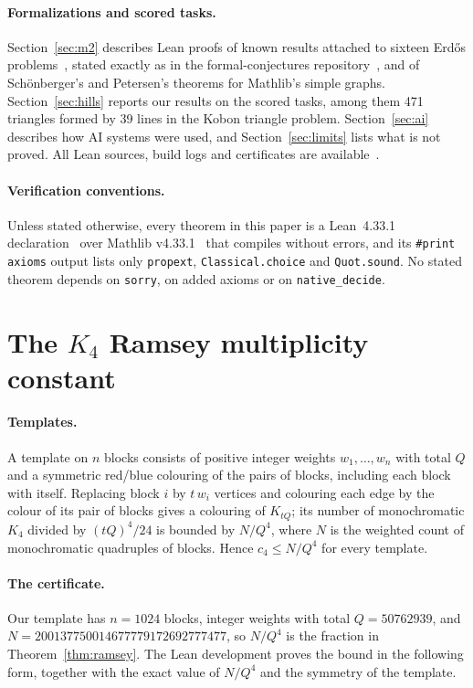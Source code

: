 \documentclass[11pt,a4paper]{article}
\newcommand{\lean}[1]{\texttt{#1}}
\theoremstyle{remark}
\begin{document}
\paragraph{Formalizations and scored tasks.}
Section~\ref{sec:m2} describes Lean proofs of known results attached to sixteen Erd\H{o}s problems~\cite{erdosproblems},
stated exactly as in the formal-conjectures repository~\cite{fc}, and of Sch\"onberger's and Petersen's theorems for
Mathlib's simple graphs. Section~\ref{sec:hills} reports our results on the scored tasks, among them 471 triangles
formed by 39 lines in the Kobon triangle problem. Section~\ref{sec:ai} describes how AI systems were used, and
Section~\ref{sec:limits} lists what is not proved. All Lean sources, build logs and certificates are available~\cite{repo}.

\paragraph{Verification conventions.}
Unless stated otherwise, every theorem in this paper is a Lean~4.33.1 declaration~\cite{lean4} over Mathlib
v4.33.1~\cite{mathlib} that compiles without errors, and its \lean{\#print axioms} output lists only \lean{propext},
\lean{Classical.choice} and \lean{Quot.sound}. No stated theorem depends on \lean{sorry}, on added axioms or on
\lean{native\_decide}.

\section{The $K_4$ Ramsey multiplicity constant}\label{sec:ramsey}

\paragraph{Templates.}
A template on $n$ blocks consists of positive integer weights $w_1,\dots,w_n$ with total $Q$ and a symmetric
red/blue colouring of the pairs of blocks, including each block with itself. Replacing block $i$ by $t\,w_i$ vertices
and colouring each edge by the colour of its pair of blocks gives a colouring of $K_{tQ}$; its number of
monochromatic $K_4$ divided by $(tQ)^4/24$ is bounded by $N/Q^4$, where $N$ is the weighted count of monochromatic
quadruples of blocks. Hence $c_4\le N/Q^4$ for every template.

\paragraph{The certificate.}
Our template has $n=1024$ blocks, integer weights with total $Q=50762939$, and
$N = 200137750014677779172692777477$, so $N/Q^4$ is the fraction in Theorem~\ref{thm:ramsey}. The Lean development
proves the bound in the following form, together with the exact value of $N/Q^4$ and the symmetry of the template.
\end{document}
